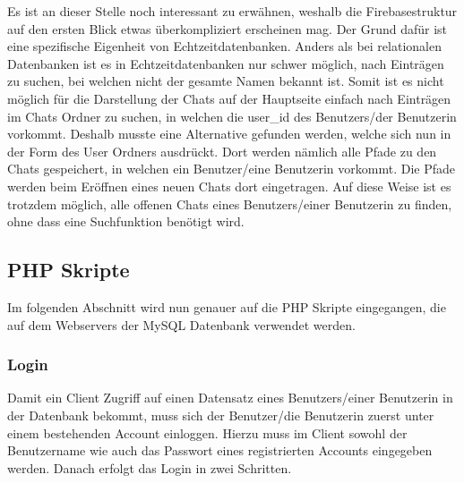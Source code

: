 \documentclass[../main.tex]{subfiles}
\begin{document}
	Es ist an dieser Stelle noch interessant zu erwähnen, weshalb die Firebasestruktur auf den ersten Blick etwas überkompliziert erscheinen mag. Der Grund dafür ist eine spezifische Eigenheit von Echtzeitdatenbanken. Anders als bei relationalen Datenbanken ist es in Echtzeitdatenbanken nur schwer möglich, nach Einträgen zu suchen, bei welchen nicht der gesamte Namen bekannt ist. Somit ist es nicht möglich für die Darstellung der Chats auf der Hauptseite einfach nach Einträgen im Chats Ordner zu suchen, in welchen die user\_id des Benutzers/der Benutzerin vorkommt. Deshalb musste eine Alternative gefunden werden, welche sich nun in der Form des User Ordners ausdrückt. Dort werden nämlich alle Pfade zu den Chats gespeichert, in welchen ein Benutzer/eine Benutzerin vorkommt. Die Pfade werden beim Eröffnen eines neuen Chats dort eingetragen. Auf diese Weise ist es trotzdem möglich, alle offenen Chats eines Benutzers/einer Benutzerin zu finden, ohne dass eine Suchfunktion benötigt wird.
	
	
	\subsection{PHP Skripte}
	Im folgenden Abschnitt wird nun genauer auf die PHP Skripte eingegangen, die auf dem Webservers der MySQL Datenbank verwendet werden.
	
	 \subsubsection{Login}
	 Damit ein Client Zugriff auf einen Datensatz eines Benutzers/einer Benutzerin in der Datenbank bekommt, muss sich der Benutzer/die Benutzerin zuerst unter einem bestehenden Account einloggen. Hierzu muss im Client sowohl der Benutzername wie auch das Passwort eines registrierten Accounts eingegeben werden. Danach erfolgt das Login in zwei Schritten.
	 
\end{document}

